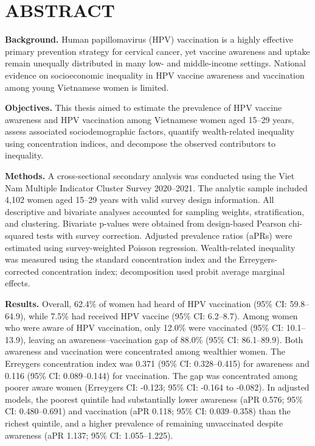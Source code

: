 \chapter*{ABSTRACT}
{}

\textbf{Background.} Human papillomavirus (HPV) vaccination is a highly effective primary prevention strategy for cervical cancer, yet vaccine awareness and uptake remain unequally distributed in many low- and middle-income settings. National evidence on socioeconomic inequality in HPV vaccine awareness and vaccination among young Vietnamese women is limited.

\textbf{Objectives.} This thesis aimed to estimate the prevalence of HPV vaccine awareness and HPV vaccination among Vietnamese women aged 15--29 years, assess associated sociodemographic factors, quantify wealth-related inequality using concentration indices, and decompose the observed contributors to inequality.

\textbf{Methods.} A cross-sectional secondary analysis was conducted using the Viet Nam Multiple Indicator Cluster Survey 2020--2021. The analytic sample included 4,102 women aged 15--29 years with valid survey design information. All descriptive and bivariate analyses accounted for sampling weights, stratification, and clustering. Bivariate p-values were obtained from design-based Pearson chi-squared tests with survey correction. Adjusted prevalence ratios (aPRs) were estimated using survey-weighted Poisson regression. Wealth-related inequality was measured using the standard concentration index and the Erreygers-corrected concentration index; decomposition used probit average marginal effects.

\textbf{Results.} Overall, 62.4\% of women had heard of HPV vaccination (95\% CI: 59.8--64.9), while 7.5\% had received HPV vaccine (95\% CI: 6.2--8.7). Among women who were aware of HPV vaccination, only 12.0\% were vaccinated (95\% CI: 10.1--13.9), leaving an awareness--vaccination gap of 88.0\% (95\% CI: 86.1--89.9). Both awareness and vaccination were concentrated among wealthier women. The Erreygers concentration index was 0.371 (95\% CI: 0.328--0.415) for awareness and 0.116 (95\% CI: 0.089--0.144) for vaccination. The gap was concentrated among poorer aware women (Erreygers CI: -0.123; 95\% CI: -0.164 to -0.082). In adjusted models, the poorest quintile had substantially lower awareness (aPR 0.576; 95\% CI: 0.480--0.691) and vaccination (aPR 0.118; 95\% CI: 0.039--0.358) than the richest quintile, and a higher prevalence of remaining unvaccinated despite awareness (aPR 1.137; 95\% CI: 1.055--1.225).

